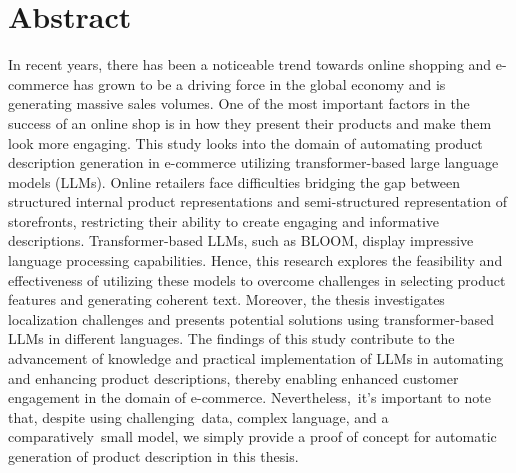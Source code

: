 \chapter*{Abstract}

In recent years, there has been a noticeable trend towards online shopping and e-commerce has grown to be a driving force in the global economy and is generating massive sales volumes. One of the most important factors in the success of an online shop is in how they present their products and make them look more engaging. This study looks into the domain of automating product description generation in e-commerce utilizing transformer-based large language models (LLMs). Online retailers face difficulties bridging the gap between structured internal product representations and semi-structured representation of storefronts, restricting their ability to create engaging and informative descriptions. Transformer-based LLMs, such as BLOOM, display impressive language processing capabilities. Hence, this research explores the feasibility and effectiveness of utilizing these models to overcome challenges in selecting product features and generating coherent text. Moreover, the thesis investigates localization challenges and presents potential solutions using transformer-based LLMs in different languages. The findings of this study contribute to the advancement of knowledge and practical implementation of LLMs in automating and enhancing product descriptions, thereby enabling enhanced customer engagement in the domain of e-commerce. Nevertheless, it's important to note that, despite using challenging data, complex language, and a comparatively small model, we simply provide a proof of concept for automatic generation of product description in this thesis.